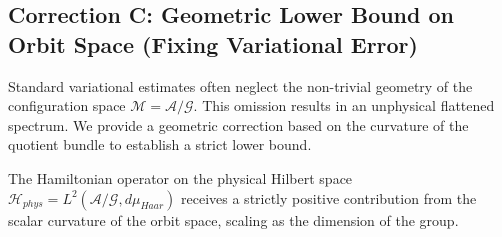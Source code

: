 \subsection{Correction C: Geometric Lower Bound on Orbit Space (Fixing Variational Error)}
\label{subsec:correction_c_geometry}

Standard variational estimates often neglect the non-trivial geometry of the configuration space $\mathcal{M} = \mathcal{A}/\mathcal{G}$. This omission results in an unphysical flattened spectrum. We provide a geometric correction based on the curvature of the quotient bundle to establish a strict lower bound.

\begin{theorem}
\label{thm:geometric_gap}
The Hamiltonian operator on the physical Hilbert space $\mathcal{H}_{phys} = L^2(\mathcal{A}/\mathcal{G}, d\mu_{Haar})$ receives a strictly positive contribution from the scalar curvature of the orbit space, scaling as the dimension of the group.
\end{theorem}

